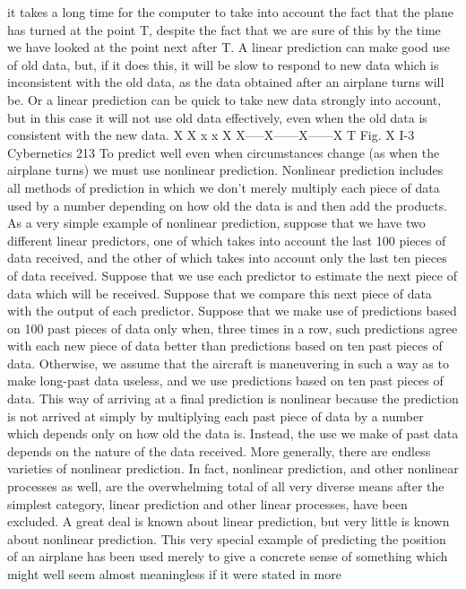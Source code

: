 {{{{{{{{{{{it takes a long time for the computer to take into account the fact
that the plane has turned at the point T, despite the fact that we
are sure of this by the time we have looked at the point next after T.
A linear prediction can make good use of old data, but, if it does
this, it will be slow to respond to new data which is inconsistent
with the old data, as the data obtained after an airplane turns will
be. Or a linear prediction can be quick to take new data strongly
into account, but in this case it will not use old data effectively,
even when the old data is consistent with the new data.
X
X
x
x
X
X-----X------X------X
T
Fig. X I-3
Cybernetics 213
To predict well even when circumstances change (as when the
airplane turns) we must use nonlinear prediction. Nonlinear prediction
includes all methods of prediction in which we don’t merely
multiply each piece of data used by a number depending on how
old the data is and then add the products.
As a very simple example of nonlinear prediction, suppose that
we have two different linear predictors, one of which takes into
account the last 100 pieces of data received, and the other of which
takes into account only the last ten pieces of data received. Suppose
that we use each predictor to estimate the next piece of data which
will be received. Suppose that we compare this next piece of data
with the output of each predictor. Suppose that we make use of
predictions based on 100 past pieces of data only when, three times
in a row, such predictions agree with each new piece of data better
than predictions based on ten past pieces of data. Otherwise, we
assume that the aircraft is maneuvering in such a way as to make
long-past data useless, and we use predictions based on ten past
pieces of data. This way of arriving at a final prediction is nonlinear
because the prediction is not arrived at simply by multiplying each
past piece of data by a number which depends only on how old
the data is. Instead, the use we make of past data depends on the
nature of the data received.
More generally, there are endless varieties of nonlinear prediction.
In fact, nonlinear prediction, and other nonlinear processes
as well, are the overwhelming total of all very diverse means after
the simplest category, linear prediction and other linear processes,
have been excluded. A great deal is known about linear prediction,
but very little is known about nonlinear prediction.
This very special example of predicting the position of an airplane
has been used merely to give a concrete sense of something
which might well seem almost meaningless if it were stated in more
}}}}}}}}}}}
